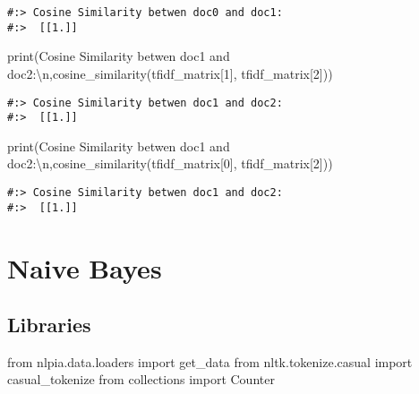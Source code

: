 \documentclass[
]{book}
\newenvironment{Shaded}{\begin{snugshade}}{\end{snugshade}}
\newcommand{\BuiltInTok}[1]{#1}
\newcommand{\CharTok}[1]{\textcolor[rgb]{0.5,0.5,0.5}{#1}}
\newcommand{\DecValTok}[1]{\textcolor[rgb]{0.06,0.06,0.06}{#1}}
\newcommand{\ImportTok}[1]{#1}
\newcommand{\NormalTok}[1]{#1}
\newcommand{\StringTok}[1]{\textcolor[rgb]{0.5,0.5,0.5}{#1}}
\begin{document}
\begin{verbatim}
#:> Cosine Similarity betwen doc0 and doc1:
#:>  [[1.]]
\end{verbatim}

\begin{Shaded}
\begin{Highlighting}[]
\BuiltInTok{print}\NormalTok{(}\StringTok{\textquotesingle{}Cosine Similarity betwen doc1 and doc2:}\CharTok{\textbackslash{}n}\StringTok{\textquotesingle{}}\NormalTok{,cosine\_similarity(tfidf\_matrix[}\DecValTok{1}\NormalTok{], tfidf\_matrix[}\DecValTok{2}\NormalTok{]))}
\end{Highlighting}
\end{Shaded}

\begin{verbatim}
#:> Cosine Similarity betwen doc1 and doc2:
#:>  [[1.]]
\end{verbatim}

\begin{Shaded}
\begin{Highlighting}[]
\BuiltInTok{print}\NormalTok{(}\StringTok{\textquotesingle{}Cosine Similarity betwen doc1 and doc2:}\CharTok{\textbackslash{}n}\StringTok{\textquotesingle{}}\NormalTok{,cosine\_similarity(tfidf\_matrix[}\DecValTok{0}\NormalTok{], tfidf\_matrix[}\DecValTok{2}\NormalTok{]))}
\end{Highlighting}
\end{Shaded}

\begin{verbatim}
#:> Cosine Similarity betwen doc1 and doc2:
#:>  [[1.]]
\end{verbatim}

\hypertarget{naive-bayes}{%
\section{Naive Bayes}\label{naive-bayes}}

\hypertarget{libraries}{%
\subsection{Libraries}\label{libraries}}

\begin{Shaded}
\begin{Highlighting}[]
\ImportTok{from}\NormalTok{ nlpia.data.loaders }\ImportTok{import}\NormalTok{ get\_data}
\ImportTok{from}\NormalTok{ nltk.tokenize.casual     }\ImportTok{import}\NormalTok{ casual\_tokenize}
\ImportTok{from}\NormalTok{ collections }\ImportTok{import}\NormalTok{ Counter}
\end{Highlighting}
\end{Shaded}
\end{document}
